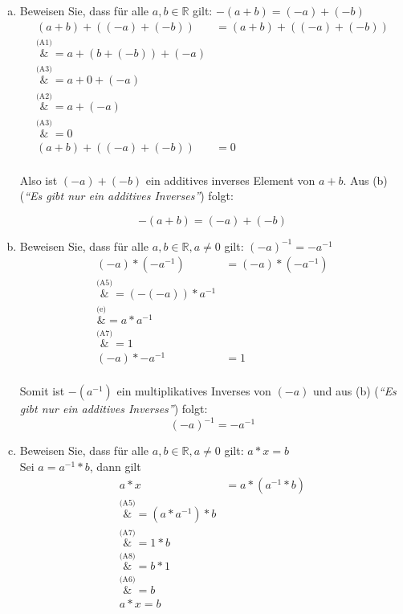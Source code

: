 \documentclass{article}
\begin{document}
\begin{enumerate}[(a)]
\item Beweisen Sie, dass für alle $a, b \in \mathbb{R}$ gilt: $-(a + b) = (-a) + (-b)$ \\

  \begin{align*}
    (a + b) + ((-a) + (-b)) &= (a + b) + ((-a) + (-b)) \\
                            \overset{\text{(A1)}}&{=} a + (b + (-b)) + (-a) \\
                            \overset{\text{(A3)}}&{=} a + 0 + (-a) \\
                            \overset{\text{(A2)}}&{=} a + (-a) \\
                            \overset{\text{(A3)}}&{=} 0 \\
    (a + b) + ((-a) + (-b)) &= 0 \\
  \end{align*}

  Also ist $(-a) + (-b)$ ein additives inverses Element von $a + b$. Aus (b)
  (\emph{``Es gibt nur ein additives Inverses''}) folgt:

  \[
    -(a + b) = (-a) + (-b)
  \]

\item Beweisen Sie, dass für alle $a, b \in \mathbb{R}, a \ne 0$ gilt: $(-a)^{-1} = -a^{-1}$ \\

  \begin{align*}
    (-a) * (-a^{-1}) &= (-a) * (-a^{-1}) \\
                     \overset{\text{(A5)}}&{=} (-(-a)) * a^{-1} \\
                     \overset{\text{(e)}}&{=} a * a^{-1} \\
                     \overset{\text{(A7)}}&{=} 1\\
    (-a) * -a^{-1} &= 1 \\
  \end{align*}

  Somit ist $-(a^{-1})$ ein multiplikatives Inverses von $(-a)$ und aus (b)
  (\emph{``Es gibt nur ein additives Inverses''}) folgt:
  \[
    (-a)^{-1} = -a^{-1}
  \]

\item Beweisen Sie, dass für alle $a, b \in \mathbb{R}, a \ne 0$ gilt: $a * x = b$ \\

  Sei $a = a^{-1} * b$, dann gilt
  \begin{align*}
    a * x &= a * (a^{-1} * b) \\
          \overset{\text{(A5)}}&{=} (a * a^{-1}) * b \\
          \overset{\text{(A7)}}&{=} 1 * b \\
          \overset{\text{(A8)}}&{=} b * 1 \\
          \overset{\text{(A6)}}&{=} b\\
    a * x = b \\
  \end{align*}


\end{enumerate}
\end{document}
